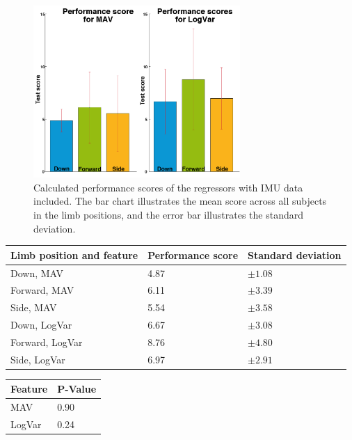 \begin{figure}[H]
	\includegraphics[width=0.7\textwidth]{figures/results/GotItTimeIMU}  %
	\caption{Calculated performance scores of the regressors with IMU data included. The bar chart illustrates the mean score across all subjects in the limb positions, and the error bar illustrates the standard deviation.}
	\label{fig:gotItTimeIMU}  %
\end{figure}

	\begin{center}
		\begin{tabular}{l l l}
			\toprule
			\textbf{Limb position and feature} & \textbf{Performance score} & \textbf{Standard deviation}\\
			\midrule
			Down, MAV & 4.87 & $\pm 1.08$ \\
			Forward, MAV & 6.11 & $\pm 3.39$ \\
			Side, MAV & 5.54 & $\pm 3.58$ \\
			Down, LogVar & 6.67 & $\pm 3.08$ \\
			Forward, LogVar & 8.76 & $\pm 4.80$ \\
			Side, LogVar & 6.97 & $\pm 2.91$ \\
			\bottomrule
		\end{tabular}
	\end{center}
	
		\begin{center}
			\begin{tabular}{l l}
				\toprule
				\textbf{Feature} & \textbf{P-Value}\\
				\midrule
				MAV & 0.90 \\
				LogVar & 0.24 \\
				\bottomrule
			\end{tabular}
		\end{center}

